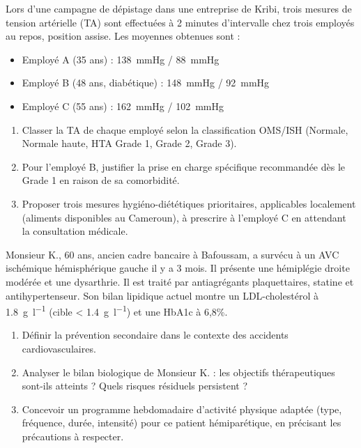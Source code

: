 \documentclass[11pt]{article}
\begin{document}
\begin{exercice}
\label{exo:tension}
Lors d'une campagne de dépistage dans une entreprise de Kribi, trois mesures de tension artérielle (TA) sont effectuées à 2 minutes d'intervalle chez trois employés au repos, position assise. Les moyennes obtenues sont :

\begin{itemize}
    \item Employé A (35 ans) : \SI{138}{\mmHg} / \SI{88}{\mmHg}
    \item Employé B (48 ans, diabétique) : \SI{148}{\mmHg} / \SI{92}{\mmHg}
    \item Employé C (55 ans) : \SI{162}{\mmHg} / \SI{102}{\mmHg}
\end{itemize}

\begin{enumerate}
    \item Classer la TA de chaque employé selon la classification OMS/ISH (Normale, Normale haute, HTA Grade 1, Grade 2, Grade 3).
    \item Pour l'employé B, justifier la prise en charge spécifique recommandée dès le Grade 1 en raison de sa comorbidité.
    \item Proposer trois mesures hygiéno-diététiques prioritaires, applicables localement (aliments disponibles au Cameroun), à prescrire à l'employé C en attendant la consultation médicale.
\end{enumerate}
\end{exercice}

\begin{exercice}
\label{exo:prevention}
Monsieur K., 60 ans, ancien cadre bancaire à Bafoussam, a survécu à un AVC ischémique hémisphérique gauche il y a 3 mois. Il présente une hémiplégie droite modérée et une dysarthrie. Il est traité par antiagrégants plaquettaires, statine et antihypertenseur. Son bilan lipidique actuel montre un LDL-cholestérol à \SI{1,8}{\gram\per\litre} (cible < \SI{1,4}{\gram\per\litre}) et une HbA1c à 6,8\%.

\begin{enumerate}
    \item Définir la prévention secondaire dans le contexte des accidents cardiovasculaires.
    \item Analyser le bilan biologique de Monsieur K. : les objectifs thérapeutiques sont-ils atteints ? Quels risques résiduels persistent ?
    \item Concevoir un programme hebdomadaire d'activité physique adaptée (type, fréquence, durée, intensité) pour ce patient hémiparétique, en précisant les précautions à respecter.
\end{enumerate}
\end{exercice}
\end{document}
